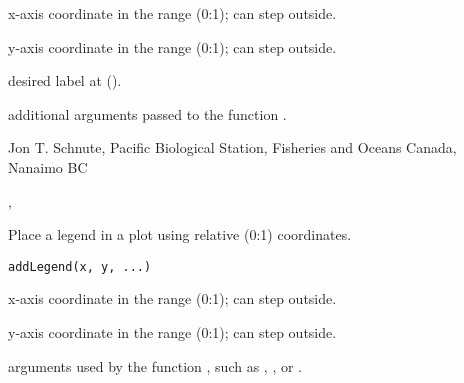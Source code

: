 \documentclass[letterpaper]{book}
\begin{document}
%
\begin{Arguments}
\begin{ldescription}
\item[\code{x}]  x-axis coordinate in the range (0:1); can step outside.
\item[\code{y}]  y-axis coordinate in the range (0:1); can step outside.
\item[\code{txt}]  desired label at ().
\item[\code{...}] additional arguments passed to the function .
\end{ldescription}
\end{Arguments}
%
\begin{Author}\relax
Jon T. Schnute, Pacific Biological Station, Fisheries and Oceans Canada, Nanaimo BC
\end{Author}
%
\begin{SeeAlso}\relax
{}, 
\end{SeeAlso}
%
\begin{Examples}
\end{Examples}
%
\begin{Description}\relax
Place a legend in a plot using relative (0:1) coordinates.
\end{Description}
%
\begin{Usage}
\begin{verbatim}
addLegend(x, y, ...) 
\end{verbatim}
\end{Usage}
%
\begin{Arguments}
\begin{ldescription}
\item[\code{x}]  x-axis coordinate in the range (0:1); can step outside.
\item[\code{y}]  y-axis coordinate in the range (0:1); can step outside.
\item[\code{...}]  arguments used by the function , 
such as , , or .
\end{ldescription}
\end{Arguments}
\end{document}
